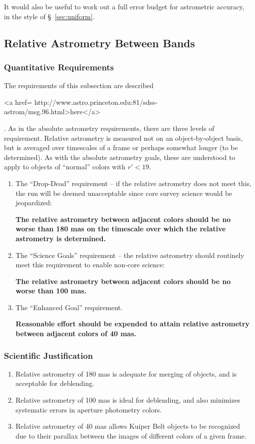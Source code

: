 It would also be useful to work out a full error budget for
astrometric accuracy, in the style of \S~\ref{sec:uniform}. 


\subsection{Relative Astrometry Between Bands}

\subsubsection {Quantitative Requirements}
The requirements of this subsection are described 
\begin{rawhtml}
<a href=
http://www.astro.princeton.edu:81/sdss-astrom/msg.96.html>here</a>\end{rawhtml}.  As in the
absolute astrometry requirements, there are three levels of 
requirement.  Relative astrometry is measured not on an
object-by-object basis, but is averaged over timescales of a frame or
perhaps somewhat longer (to be determined). 
As with the absolute astrometry goals, these are
understood to apply to objects of ``normal'' colors with $r' < 19$. 
\begin{enumerate}
\item The ``Drop-Dead'' requirement -- if the relative astrometry does not meet
this, the run will be deemed unacceptable since core survey science
would be jeopardized:

{\bf The relative astrometry between adjacent colors should be no
worse than 180 mas on the timescale over which the relative astrometry
is determined.}

\item The ``Science Goals'' requirement -- the relative astrometry should routinely
meet this requirement to enable non-core science:

{\bf The relative astrometry between adjacent colors should be no worse than
100 mas.}

\item The ``Enhanced Goal'' requirement. 

{\bf Reasonable effort should be expended to attain relative astrometry
between adjacent colors of 40 mas.}
\end{enumerate}

\subsubsection{Scientific Justification}
\begin{enumerate} 
\item Relative astrometry of 180 mas is adequate for merging of
objects, and is acceptable for deblending. 
\item Relative astrometry of 100 mas is ideal for deblending, and also
minimizes systematic errors in aperture photometry colors. 
\item Relative astrometry of 40 mas allows Kuiper Belt objects to be
recognized due to their parallax between the images of different
colors of a given frame. 
\end{enumerate}

